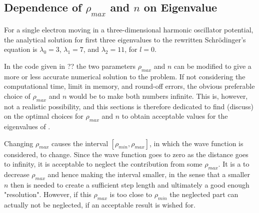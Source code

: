 \subsection{Dependence of $\rho_{max}$ and $n$ on Eigenvalue}
\label{subsec:DependenceOnEigenvalue}
For a single electron moving in a three-dimensional harmonic oscillator potential, the analytical solution for first three eigenvalues to the rewritten Schrödinger's equation 
is $\lambda_0 = 3$, $\lambda_1 = 7$, and $\lambda_2 = 11$, for  $l=0$.

In the code given in ?? the two parameters $\rho_{max}$ and $n$ can be modified to give a more or less accurate numerical solution to the problem.
If not considering the computational time, limit in memory, and round-off errors, the obvious preferable choice of $\rho_{max}$ and $n$ would be to make both numbers infinite. 
This is, however, not a realistic possibility, and this sections is therefore dedicated to find (discuss) on the optimal choices for $\rho_{max}$ and $n$ to obtain acceptable values for the eigenvalues of .

Changing $\rho_{max}$ causes the interval $[\rho_{min}, \rho_{max}]$, in which the wave function is considered, to change. 
Since the wave function goes to zero as the distance goes to infinity, it is acceptable to neglect the contribution from some $\rho_{max}$. 
It is a  to decrease $\rho_{max}$ and hence making the interval smaller, in the sense that a smaller $n$ then is needed to create a sufficient step length and ultimately a good enough "resolution". 
However, if this $\rho_{max}$ is too close to $\rho_{min}$ the neglected part can actually not be neglected, if an acceptable result is wished for. 

